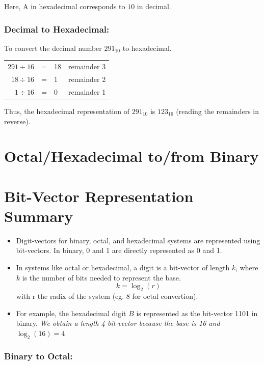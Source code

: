 \documentclass[12pt,openany]{book}
\begin{document}
	Here, \( \text{A} \) in hexadecimal corresponds to \( 10 \) in decimal.
	
	
	
	    
	
	
	    
	\subsubsection*{Decimal to Hexadecimal:}
	  
	To convert the decimal number \(291_{10}\) to hexadecimal.
	    
	\begin{tabular}{rclr}
		$291 \div 16$ & = & 18 & remainder 3 \\
		$18 \div 16$  & = & 1  & remainder 2 \\
		$1 \div 16$   & = & 0  & remainder 1 \\
	\end{tabular}
	    
	\vspace*{10px}
	Thus, the hexadecimal representation of \(291_{10}\) is \(123_{16}\) (reading the remainders in reverse).
	    
	
	
	\section{Octal/Hexadecimal to/from Binary}
	\section*{Bit-Vector Representation Summary}
	
	\begin{itemize}
		\item Digit-vectors for binary, octal, and hexadecimal systems are represented using bit-vectors. In binary, 0 and 1 are directly represented as 0 and 1.
		\item In systems like octal or hexadecimal, a digit is a bit-vector of length \( k \), where \( k \) is the number of bits needed to represent the base.$$k=\log_{2}(r)$$
		      with r the radix of the system (eg. 8 for octal convertion).
		\item For example, the hexadecimal digit \( B \) is represented as the bit-vector 1101 in binary. \textit{We obtain a length 4 bit-vector because the base is 16 and \( \log_{2}(16) = 4 \)}
	\end{itemize}
	
	\subsubsection*{Binary to Octal:}
	
\end{document}
